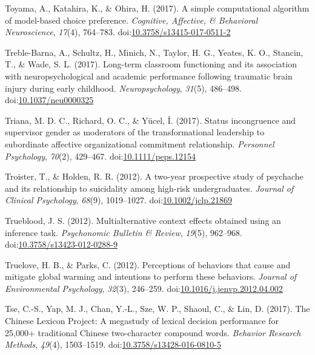 \documentclass[english,man]{apa6}
\theoremstyle{definition}
\theoremstyle{definition}
\theoremstyle{definition}
\theoremstyle{remark}
\begin{document}
\hypertarget{ref-Toyama2017}{}
Toyama, A., Katahira, K., \& Ohira, H. (2017). A simple computational
algorithm of model-based choice preference. \emph{Cognitive, Affective,
\& Behavioral Neuroscience}, \emph{17}(4), 764--783.
doi:\href{https://doi.org/10.3758/s13415-017-0511-2}{10.3758/s13415-017-0511-2}

\hypertarget{ref-Treble-barna2017}{}
Treble-Barna, A., Schultz, H., Minich, N., Taylor, H. G., Yeates, K. O.,
Stancin, T., \& Wade, S. L. (2017). Long-term classroom functioning and
its association with neuropsychological and academic performance
following traumatic brain injury during early childhood.
\emph{Neuropsychology}, \emph{31}(5), 486--498.
doi:\href{https://doi.org/10.1037/neu0000325}{10.1037/neu0000325}

\hypertarget{ref-Triana2017}{}
Triana, M. D. C., Richard, O. C., \& Yücel, İ. (2017). Status
incongruence and supervisor gender as moderators of the transformational
leadership to subordinate affective organizational commitment
relationship. \emph{Personnel Psychology}, \emph{70}(2), 429--467.
doi:\href{https://doi.org/10.1111/peps.12154}{10.1111/peps.12154}

\hypertarget{ref-Troister2012}{}
Troister, T., \& Holden, R. R. (2012). A two-year prospective study of
psychache and its relationship to suicidality among high-risk
undergraduates. \emph{Journal of Clinical Psychology}, \emph{68}(9),
1019--1027.
doi:\href{https://doi.org/10.1002/jclp.21869}{10.1002/jclp.21869}

\hypertarget{ref-Trueblood2012}{}
Trueblood, J. S. (2012). Multialternative context effects obtained using
an inference task. \emph{Psychonomic Bulletin \& Review}, \emph{19}(5),
962--968.
doi:\href{https://doi.org/10.3758/s13423-012-0288-9}{10.3758/s13423-012-0288-9}

\hypertarget{ref-Truelove2012}{}
Truelove, H. B., \& Parks, C. (2012). Perceptions of behaviors that
cause and mitigate global warming and intentions to perform these
behaviors. \emph{Journal of Environmental Psychology}, \emph{32}(3),
246--259.
doi:\href{https://doi.org/10.1016/j.jenvp.2012.04.002}{10.1016/j.jenvp.2012.04.002}

\hypertarget{ref-Tse2017}{}
Tse, C.-S., Yap, M. J., Chan, Y.-L., Sze, W. P., Shaoul, C., \& Lin, D.
(2017). The Chinese Lexicon Project: A megastudy of lexical decision
performance for 25,000+ traditional Chinese two-character compound
words. \emph{Behavior Research Methods}, \emph{49}(4), 1503--1519.
doi:\href{https://doi.org/10.3758/s13428-016-0810-5}{10.3758/s13428-016-0810-5}
\end{document}
